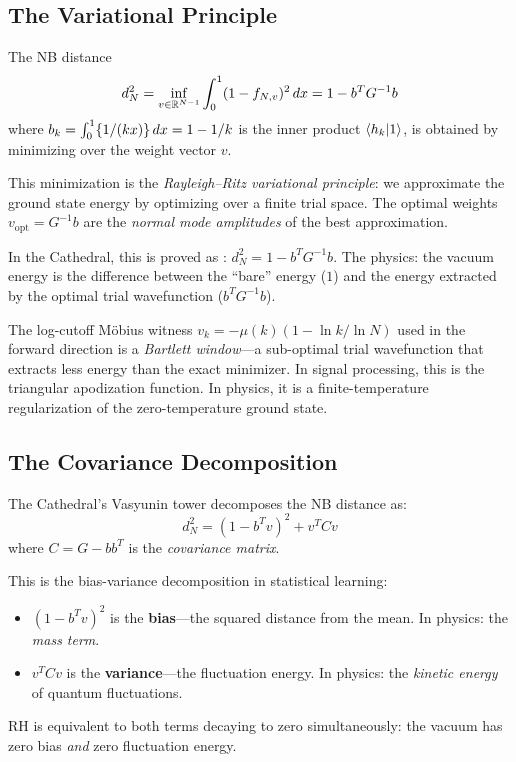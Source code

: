 \documentclass[11pt,a4paper]{article}
\begin{document}
\subsection{The Variational Principle}

The NB distance
\[
  d_N^2 = \inf_{v \in \mathbb{R}^{N-1}} \int_0^1 (1 - f_{N,v})^2\,dx
  = 1 - b^T G^{-1} b
\]
where $b_k = \int_0^1 \{1/(kx)\}\,dx = 1 - 1/k$ is the inner product
$\langle h_k | 1 \rangle$, is obtained by minimizing over the weight vector $v$.

\begin{principle}
This minimization is the \emph{Rayleigh--Ritz variational principle}:
we approximate the ground state energy by optimizing over a finite
trial space. The optimal weights $v_{\mathrm{opt}} = G^{-1}b$ are the
\emph{normal mode amplitudes} of the best approximation.

In the Cathedral, this is proved as :
$d_N^2 = 1 - b^T G^{-1} b$. The physics: the vacuum energy is the
difference between the ``bare'' energy ($1$) and the energy extracted
by the optimal trial wavefunction ($b^T G^{-1} b$).
\end{principle}

The log-cutoff M\"obius witness $v_k = -\mu(k)(1 - \ln k / \ln N)$ used
in the forward direction is a \emph{Bartlett window}---a sub-optimal
trial wavefunction that extracts less energy than the exact minimizer.
In signal processing, this is the triangular apodization function.
In physics, it is a finite-temperature regularization of the
zero-temperature ground state.

\subsection{The Covariance Decomposition}

The Cathedral's Vasyunin tower decomposes the NB distance as:
\[
  d_N^2 = (1 - b^T v)^2 + v^T C v
\]
where $C = G - b b^T$ is the \emph{covariance matrix}.

\begin{correspondence}
This is the bias-variance decomposition in statistical learning:
\begin{itemize}
  \item $(1 - b^T v)^2$ is the \textbf{bias}---the squared distance
    from the mean. In physics: the \emph{mass term}.
  \item $v^T C v$ is the \textbf{variance}---the fluctuation energy.
    In physics: the \emph{kinetic energy} of quantum fluctuations.
\end{itemize}
RH is equivalent to both terms decaying to zero simultaneously:
the vacuum has zero bias \emph{and} zero fluctuation energy.
\end{correspondence}
\end{document}
